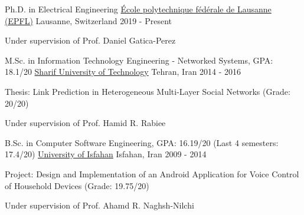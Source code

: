 \begin{cventries}
\cventry
    {Ph.D. in Electrical Engineering}
    {\href{https://www.epfl.ch/en/home/}{École polytechnique fédérale de Lausanne (EPFL)}}
    {Lausanne, Switzerland}
    {2019 - Present}
    {\begin{cvitems}
        \item {Under supervision of Prof. Daniel Gatica-Perez}
      \end{cvitems}}
\cventry
    {M.Sc. in Information Technology Engineering - Networked Systems, GPA: 18.1/20}
    {\href{http://www.en.sharif.edu/}{Sharif University of Technology}}
    {Tehran, Iran}
    {2014 - 2016}
    {\begin{cvitems}
        \item {Thesis: Link Prediction in Heterogeneous Multi-Layer Social Networks (Grade: 20/20)}
        \item {Under supervision of Prof. Hamid R. Rabiee}
      \end{cvitems}}
\cventry
{B.Sc. in Computer Software Engineering, GPA: 16.19/20 (Last 4 semesters: 17.4/20)}
{\href{http://ui.ac.ir/}{University of Isfahan}}
{Isfahan, Iran}
{2009 - 2014}
{\begin{cvitems}
    \item {Project: Design and Implementation of an Android Application for Voice Control of Household Devices (Grade: 19.75/20)}
    \item {Under supervision of Prof. Ahamd R. Naghsh-Nilchi}
  \end{cvitems}}
\end{cventries}
